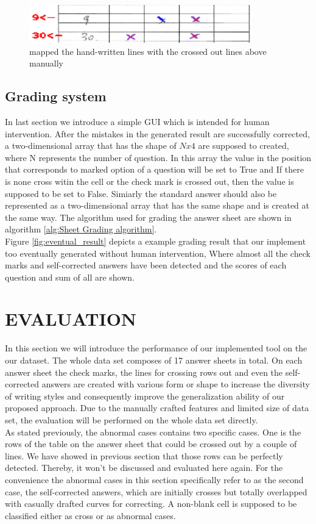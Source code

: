 \documentclass[a4paper,twoside]{article}
\begin{document}
 \begin{figure}[!h]
  \centering
  \includegraphics[width=0.8\columnwidth]{Latex/imgs/gui_3.PNG}
  \caption{mapped the hand-written lines with the crossed out lines above manually}
  \label{fig: gui_3}
 \end{figure}
 \subsection{Grading system}
 In last section we introduce a simple GUI which is intended for human intervention. After the mistakes in the generated result are successfully corrected, a two-dimensional array that has the shape of $Nx4$ are supposed to created, where N represents the number of question. In this array the value in the position that corresponds to marked option of a question will be set to True and If there is none cross witin the cell or the check mark is crossed out, then the value is supposed to be set to False. Simiarly the standard answer should also be represented as a two-dimensional array that has the same shape and is created at the same way. The algorithm used for grading the answer sheet are shown in algorithm \ref{alg:Sheet Grading algorithm}.\\
Figure \ref{fig:eventual_result} depicts a example grading result that our implement too eventually generated without human intervention, Where almost all the check marks and self-corrected answers have been detected and the scores of each question and sum of all are shown.


\section{\uppercase{Evaluation}}
In this section we will introduce the performance of our implemented tool on the our dataset. The whole data set composes of 17 answer sheets in total. On each answer sheet the check marks, the lines for crossing rows out and even the self-corrected answers are created with various form or shape to increase the diversity of writing styles and consequently improve the generalization ability of our proposed approach. Due to the manually crafted features and limited size of data set, the evaluation will be performed on the whole data set directly.\\
As stated previously, the abnormal cases contains two specific cases. One is the rows of the table on the answer sheet that could be crossed out by a couple of lines. We have showed in previous section that those rows can be perfectly detected. Thereby, it won't be discussed and evaluated here again. For the convenience the abnormal cases in this section specifically refer to as the second case, the self-corrected answers, which are initially crosses but totally overlapped with casually drafted curves for correcting. A non-blank cell is supposed to be classified either as cross or as abnormal cases.\\ 
\end{document}
